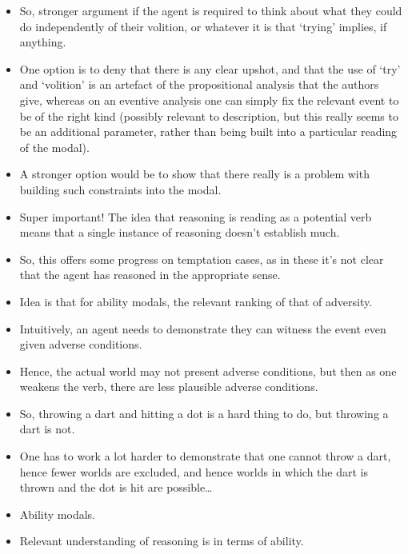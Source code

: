 \documentclass[10pt]{article}
\begin{document}
\begin{itemize}
\item So, stronger argument if the agent is required to think about what they could do independently of their volition, or whatever it is that `trying' implies, if anything.
\item One option is to deny that there is any clear upshot, and that the use of `try' and `volition' is an artefact of the propositional analysis that the authors give, whereas on an eventive analysis one can simply fix the relevant event to be of the right kind (possibly relevant to description, but this really seems to be an additional parameter, rather than being built into a particular reading of the modal).
\item A stronger option would be to show that there really is a problem with building such constraints into the modal.
\end{itemize}

\begin{itemize}
\item Super important! The idea that reasoning is reading as a potential verb means that a single instance of reasoning doesn't establish much.
\item So, this offers some progress on temptation cases, as in these it's not clear that the agent has reasoned in the appropriate sense.
\end{itemize}

\begin{itemize}
\item Idea is that for ability modals, the relevant ranking of that of adversity.
\item Intuitively, an agent needs to demonstrate they can witness the event even given adverse conditions.
\item Hence, the actual world may not present adverse conditions, but then as one weakens the verb, there are less plausible adverse conditions.
\item So, throwing a dart and hitting a dot is a hard thing to do, but throwing a dart is not.
\item One has to work a lot harder to demonstrate that one cannot throw a dart, hence fewer worlds are excluded, and hence worlds in which the dart is thrown and the dot is hit are possible\dots
\end{itemize}

\newpage

\begin{itemize}
\item Ability modals.
\item Relevant understanding of reasoning is in terms of ability.
\end{itemize}
\end{document}
